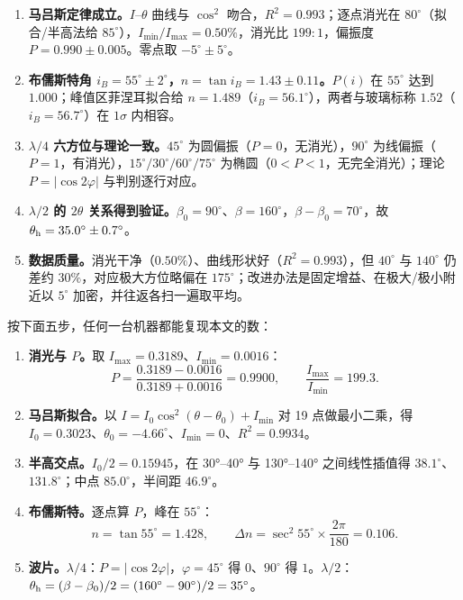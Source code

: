 \documentclass[11pt]{ctexart}
\begin{document}

\begin{enumerate}
\item \textbf{马吕斯定律成立。}$I$--$\theta$ 曲线与 $\cos^2$ 吻合，$R^2=0.993$；逐点消光在 $80^\circ$（拟合/半高法给 $85^\circ$），$I_{\min}/I_{\max}=0.50\%$，消光比 $199:1$，偏振度 $P=0.990\pm0.005$。零点取 $-5^\circ\pm5^\circ$。
\item \textbf{布儒斯特角 $i_B=55^\circ\pm2^\circ$，$n=\tan i_B=1.43\pm0.11$。}$P(i)$ 在 $55^\circ$ 达到 $1.000$；峰值区菲涅耳拟合给 $n=1.489$（$i_B=56.1^\circ$），两者与玻璃标称 $1.52$（$i_B=56.7^\circ$）在 $1\sigma$ 内相容。
\item \textbf{$\lambda/4$ 六方位与理论一致。}$45^\circ$ 为圆偏振（$P=0$，无消光），$90^\circ$ 为线偏振（$P=1$，有消光），$15^\circ/30^\circ/60^\circ/75^\circ$ 为椭圆（$0<P<1$，无完全消光）；理论 $P=|\cos2\varphi|$ 与判别逐行对应。
\item \textbf{$\lambda/2$ 的 $2\theta$ 关系得到验证。}$\beta_0=90^\circ$、$\beta=160^\circ$，$\beta-\beta_0=70^\circ$，故 $\theta_{\rm h}=35.0^\circ\pm0.7^\circ$。
\item \textbf{数据质量。}消光干净（$0.50\%$）、曲线形状好（$R^2=0.993$），但 $40^\circ$ 与 $140^\circ$ 仍差约 $30\%$，对应极大方位略偏在 $175^\circ$；改进办法是固定增益、在极大/极小附近以 $5^\circ$ 加密，并往返各扫一遍取平均。
\end{enumerate}


按下面五步，任何一台机器都能复现本文的数：

\begin{enumerate}
\item \textbf{消光与 $P$。}取 $I_{\max}=0.3189$、$I_{\min}=0.0016$：
\[
P=\frac{0.3189-0.0016}{0.3189+0.0016}=0.9900,\qquad \frac{I_{\max}}{I_{\min}}=199.3 .
\]
\item \textbf{马吕斯拟合。}以 $I=I_0\cos^2(\theta-\theta_0)+I_{\min}$ 对 19 点做最小二乘，得 $I_0=0.3023$、$\theta_0=-4.66^\circ$、$I_{\min}=0$、$R^2=0.9934$。
\item \textbf{半高交点。}$I_0/2=0.15945$，在 30°--40° 与 130°--140° 之间线性插值得 $38.1^\circ$、$131.8^\circ$；中点 $85.0^\circ$，半间距 $46.9^\circ$。
\item \textbf{布儒斯特。}逐点算 $P$，峰在 $55^\circ$：
\[
n=\tan55^\circ=1.428,\qquad \Delta n=\sec^2 55^\circ\times\frac{2\pi}{180}=0.106 .
\]
\item \textbf{波片。}$\lambda/4$：$P=|\cos2\varphi|$，$\varphi=45^\circ$ 得 $0$、$90^\circ$ 得 $1$。$\lambda/2$：$\theta_{\rm h}=(\beta-\beta_0)/2=(160^\circ-90^\circ)/2=35^\circ$。
\end{enumerate}
\end{document}
